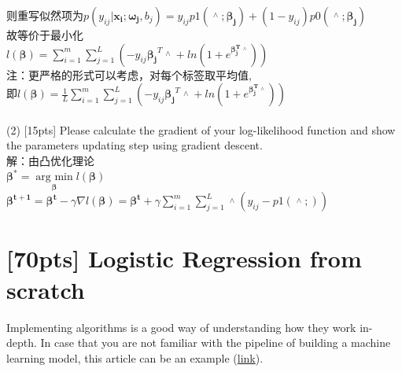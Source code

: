 \documentclass{article}
\begin{document}
则重写似然项为$p(y_{ij}|\bm{x_i};\bm{\omega_j},b_j)=y_{ij}p1(\mathop{\bm{x_i}}\limits^{\wedge};\bm{\beta_j})+(1-y_{ij})p0(\mathop{\bm{x_i}}\limits^{\wedge};\bm{\beta_j})$\\
故等价于最小化\\
$l(\bm{\beta})=\sum\limits_{i=1}^m{\sum\limits_{j=1}^L{(-y_{ij}\bm{\beta_j}^T\mathop{\bm{x_i}}\limits^{\wedge}+ln(1+e^{\bm{\beta_j^T\mathop{\bm{x_i}}\limits^{\wedge}}}))}}$\\
注：更严格的形式可以考虑，对每个标签取平均值, \\即$l(\bm{\beta})=\frac{1}{L}\sum\limits_{i=1}^m{\sum\limits_{j=1}^L{(-y_{ij}\bm{\beta_j}^T\mathop{\bm{x_i}}\limits^{\wedge}+ln(1+e^{\bm{\beta_j^T\mathop{\bm{x_i}}\limits^{\wedge}}}))}}$
\\\\
    (2) [15pts] Please calculate the gradient of your log-likelihood function and show the parameters updating step using gradient descent.\\
解：由凸优化理论\\
$\bm{\beta^{*}}=\mathop{arg\ min}\limits_{\bm{\beta}}l(\bm{\beta})$\\
${\bm{\beta^{t+1}}}=\bm{\beta^{t}}-\gamma\nabla l(\bm{\beta})=\bm{\beta^{t}}+\gamma\sum\limits_{i=1}^m{\sum\limits_{j=1}^L{\mathop{\bm{x_i}}\limits^{\wedge}(y_{ij}-p1(\mathop{\bm{x_i}}\limits^{\wedge};\bm{}))}}$




%
%
%	
%
%	
%	
%	


\section{[70pts] Logistic Regression from scratch  }
Implementing algorithms is a good way of understanding how they work in-depth. In case that you are not familiar with the pipeline of building a machine learning model, this article can be an example (\href{https://www.jianshu.com/p/ecb89148ed64}{link}).
\end{document}
